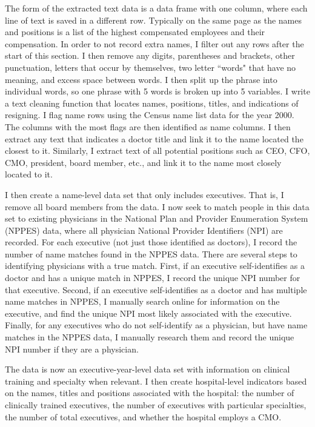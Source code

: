 \documentclass[12pt]{article}
\begin{document}
The form of the extracted text data is a data frame with one column, where each line of text is saved in a different row. Typically on the same page as the names and positions is a list of the highest compensated employees and their compensation. In order to not record extra names, I filter out any rows after the start of this section. I then remove any digits, parentheses and brackets, other punctuation, letters that occur by themselves, two letter ``words" that have no meaning, and excess space between words. I then split up the phrase into individual words, so one phrase with 5 words is broken up into 5 variables. I write a text cleaning function that locates names, positions, titles, and indications of resigning. I flag name rows using the Census name list data for the year 2000. The columns with the most flags are then identified as name columns. I then extract any text that indicates a doctor title and link it to the name located the closest to it. Similarly, I extract text of all potential positions such as CEO, CFO, CMO, president, board member, etc., and link it to the name most closely located to it. 

I then create a name-level data set that only includes executives. That is, I remove all board members from the data. I now seek to match people in this data set to existing physicians in the National Plan and Provider Enumeration System (NPPES) data, where all physician National Provider Identifiers (NPI) are recorded. For each executive (not just those identified as doctors), I record the number of name matches found in the NPPES data. There are several steps to identifying physicians with a true match. First, if an executive self-identifies as a doctor and has a unique match in NPPES, I record the unique NPI number for that executive. Second, if an executive self-identifies as a doctor and has multiple name matches in NPPES, I manually search online for information on the executive, and find the unique NPI most likely associated with the executive. Finally, for any executives who do not self-identify as a physician, but have name matches in the NPPES data, I manually research them and record the unique NPI number if they are a physician. 

The data is now an executive-year-level data set with information on clinical training and specialty when relevant. I then create hospital-level indicators based on the names, titles and positions associated with the hospital: the number of clinically trained executives, the number of executives with particular specialties, the number of total executives, and whether the hospital employs a CMO. 
\end{document}
